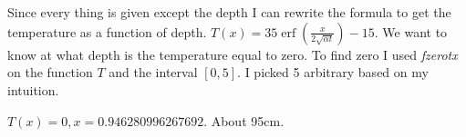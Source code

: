 \documentclass[12pt]{article}
\DeclareMathOperator{\erf}{erf}
\begin{document}
\section{}

Since every thing is given except the depth I can rewrite the formula to get the temperature as a function of depth. 
$T(x) = 35\erf(\frac{x}{2\sqrt{\alpha t}}) - 15$. We want to know at what depth is the temperature equal to zero. To find zero I used \textit{fzerotx} on the function $T$ and the interval $[0, 5]$. I picked 5 arbitrary based on my intuition.

$T(x) = 0, x = 0.946280996267692$. About 95cm.
\end{document}
